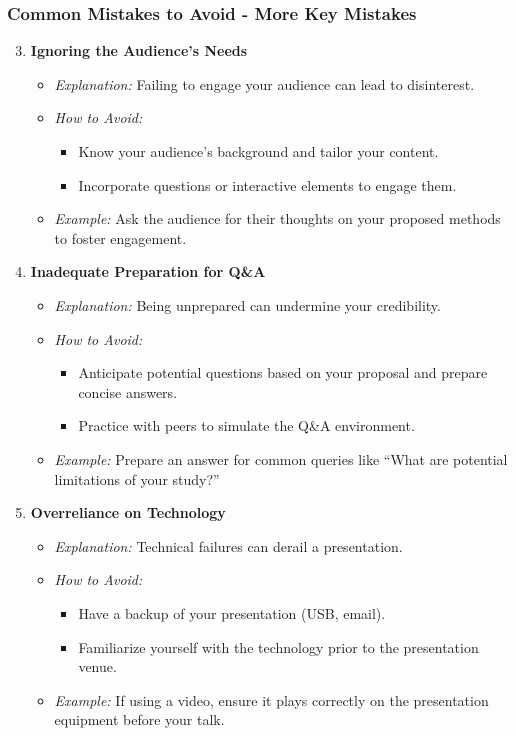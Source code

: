 \documentclass[aspectratio=169]{beamer}
\begin{document}
\begin{frame}[fragile]
  \frametitle{Common Mistakes to Avoid - More Key Mistakes}
  \begin{enumerate}
    \setcounter{enumi}{2}
    \item \textbf{Ignoring the Audience’s Needs}
      \begin{itemize}
        \item \textit{Explanation:} Failing to engage your audience can lead to disinterest.
        \item \textit{How to Avoid:}
        \begin{itemize}
          \item Know your audience's background and tailor your content.
          \item Incorporate questions or interactive elements to engage them.
        \end{itemize}
        \item \textit{Example:} Ask the audience for their thoughts on your proposed methods to foster engagement.
      \end{itemize}

    \item \textbf{Inadequate Preparation for Q\&A}
      \begin{itemize}
        \item \textit{Explanation:} Being unprepared can undermine your credibility.
        \item \textit{How to Avoid:}
        \begin{itemize}
          \item Anticipate potential questions based on your proposal and prepare concise answers.
          \item Practice with peers to simulate the Q\&A environment.
        \end{itemize}
        \item \textit{Example:} Prepare an answer for common queries like “What are potential limitations of your study?”
      \end{itemize}
    
    \item \textbf{Overreliance on Technology}
      \begin{itemize}
        \item \textit{Explanation:} Technical failures can derail a presentation.
        \item \textit{How to Avoid:}
        \begin{itemize}
          \item Have a backup of your presentation (USB, email).
          \item Familiarize yourself with the technology prior to the presentation venue.
        \end{itemize}
        \item \textit{Example:} If using a video, ensure it plays correctly on the presentation equipment before your talk.
      \end{itemize}
  \end{enumerate}
\end{frame}
\end{document}
